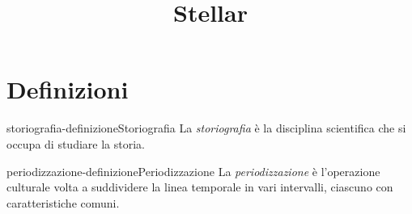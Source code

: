 \documentclass[preview]{standalone}
\begin{document}
\title{Stellar}
\genpage

\section{Definizioni}

\begin{snippetdefinition}{storiografia-definizione}{Storiografia}
    La \textit{storiografia} è la disciplina scientifica che si occupa di studiare la storia.
\end{snippetdefinition}

\begin{snippetdefinition}{periodizzazione-definizione}{Periodizzazione}
    La \textit{periodizzazione} è l'operazione culturale volta a suddividere la linea temporale in vari intervalli,
    ciascuno con caratteristiche comuni.
\end{snippetdefinition}

\end{document}
